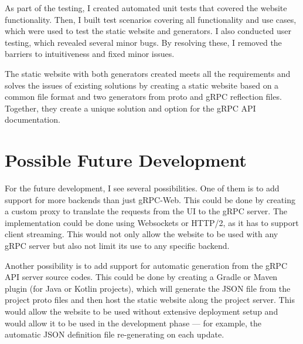 As part of the testing, I created automated unit tests that covered the website functionality.
Then, I built test scenarios covering all functionality and use cases, which were used to test the static website and generators.
I also conducted user testing, which revealed several minor bugs.
By resolving these, I removed the barriers to intuitiveness and fixed minor issues.

The static website with both generators created meets all the requirements and solves the issues of existing solutions by creating a static website based on a common file format and two generators from proto and gRPC reflection files.
Together, they create a unique solution and option for the gRPC API documentation.


\section{Possible Future Development}
For the future development, I see several possibilities.
One of them is to add support for more backends than just gRPC-Web.
This could be done by creating a custom proxy to translate the requests from the UI to the gRPC server.
The implementation could be done using Websockets or HTTP/2, as it has to support client streaming.
This would not only allow the website to be used with any gRPC server but also not limit its use to any specific backend.

Another possibility is to add support for automatic generation from the gRPC API server source codes.
This could be done by creating a Gradle or Maven plugin (for Java or Kotlin projects), which will generate the JSON file from the project proto files and then host the static website along the project server.
This would allow the website to be used without extensive deployment setup and would allow it to be used in the development phase — for example, the automatic JSON definition file re-generating on each update.